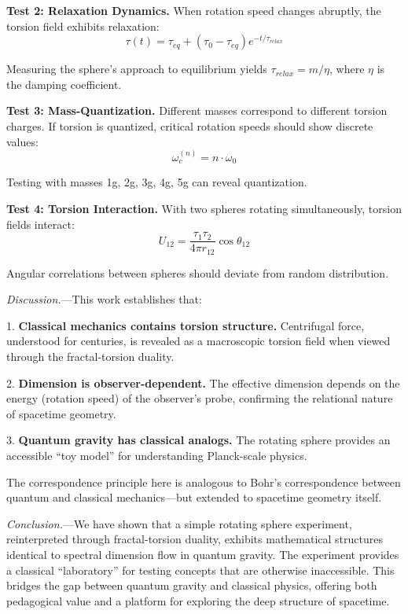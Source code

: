 \documentclass[aps,prl,twocolumn,superscriptaddress,floatfix]{revtex4-2}
\begin{document}
\textbf{Test 2: Relaxation Dynamics.} When rotation speed changes abruptly, the torsion field exhibits relaxation:
\begin{equation}
    \tau(t) = \tau_{eq} + (\tau_0 - \tau_{eq})e^{-t/\tau_{relax}}
\end{equation}

Measuring the sphere's approach to equilibrium yields $\tau_{relax} = m/\eta$, where $\eta$ is the damping coefficient.

\textbf{Test 3: Mass-Quantization.} Different masses correspond to different torsion charges. If torsion is quantized, critical rotation speeds should show discrete values:
\begin{equation}
    \omega_c^{(n)} = n \cdot \omega_0
\end{equation}

Testing with masses 1g, 2g, 3g, 4g, 5g can reveal quantization.

\textbf{Test 4: Torsion Interaction.} With two spheres rotating simultaneously, torsion fields interact:
\begin{equation}
    U_{12} = \frac{\tau_1 \tau_2}{4\pi r_{12}} \cos\theta_{12}
\end{equation}

Angular correlations between spheres should deviate from random distribution.

\textit{Discussion.}---This work establishes that:

1. \textbf{Classical mechanics contains torsion structure.} Centrifugal force, understood for centuries, is revealed as a macroscopic torsion field when viewed through the fractal-torsion duality.

2. \textbf{Dimension is observer-dependent.} The effective dimension depends on the energy (rotation speed) of the observer's probe, confirming the relational nature of spacetime geometry.

3. \textbf{Quantum gravity has classical analogs.} The rotating sphere provides an accessible ``toy model'' for understanding Planck-scale physics.

The correspondence principle here is analogous to Bohr's correspondence between quantum and classical mechanics---but extended to spacetime geometry itself.

\textit{Conclusion.}---We have shown that a simple rotating sphere experiment, reinterpreted through fractal-torsion duality, exhibits mathematical structures identical to spectral dimension flow in quantum gravity. The experiment provides a classical ``laboratory'' for testing concepts that are otherwise inaccessible. This bridges the gap between quantum gravity and classical physics, offering both pedagogical value and a platform for exploring the deep structure of spacetime.
\end{document}
